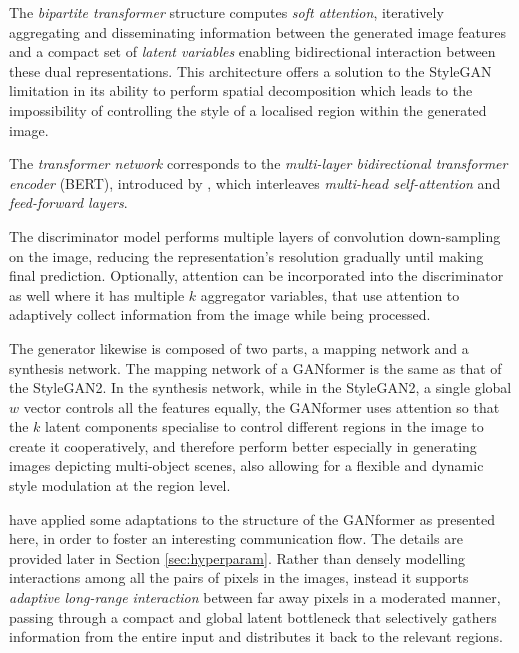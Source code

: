 \documentclass{article}
\begin{document}
	The \textit{bipartite transformer} structure computes \textit{soft attention}, iteratively aggregating 
	and disseminating information between the generated image features and a compact set of 
	\textit{latent variables} enabling bidirectional interaction between these dual representations. 
	This architecture offers a solution to the StyleGAN limitation in its ability to perform spatial 
	decomposition which leads to the impossibility of controlling the style of a localised region 
	within the generated image.
	
	The \textit{transformer network} corresponds to the \textit{multi-layer bidirectional transformer 
		encoder} (BERT), introduced by \citet{devlin2019bert}, which interleaves \textit{multi-head 
		self-attention} and \textit{feed-forward layers}. 
	
	The discriminator model performs multiple layers of convolution down-sampling on the image, 
	reducing the representation's resolution gradually until making final prediction. 
	Optionally, attention can be incorporated into the discriminator as well where it has multiple $k$ 
	aggregator variables, that use attention to adaptively collect information from the image while being 
	processed. 
	
	The generator likewise is composed of two parts, a mapping network and a synthesis 
	network. 
	The mapping network of a GANformer is the same as that of the StyleGAN2.
	In the synthesis network, while in the StyleGAN2, a single global $w$ vector controls all the 
	features equally, the GANformer uses attention so that the $k$ latent components specialise to 
	control different regions in the image to create it cooperatively, and therefore perform better 
	especially in generating images depicting multi-object scenes, also allowing for a flexible and 
	dynamic style modulation at the region level.
	
	\citet{hudson2021generative} have applied some adaptations to the structure of the GANformer as 
	presented here, in order to foster an interesting communication flow. The details are provided later 
	in Section \ref{sec:hyperparam}.
	Rather than densely modelling interactions among all the pairs of pixels in the images, instead it 
	supports \textit{adaptive long-range interaction} between far away pixels in a moderated manner, 
	passing through a compact and global latent bottleneck that selectively gathers information from 
	the entire input and distributes it back to the relevant regions. 
	
\end{document}
